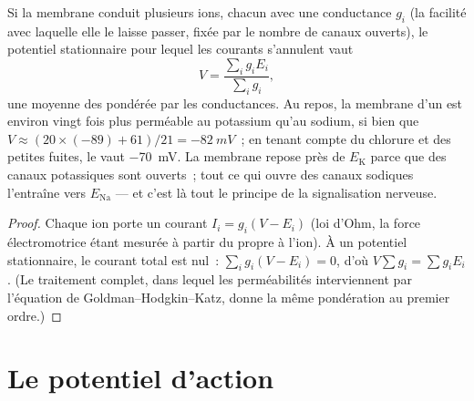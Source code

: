 \begin{theorem}\label{thm:b2:neurons-synapses:chord}
Si la membrane conduit plusieurs ions, chacun avec une conductance $g_i$
(la facilité avec laquelle elle le laisse passer, fixée par le nombre de
canaux ouverts), le potentiel stationnaire pour lequel les courants
s'annulent vaut
\[
V = \frac{\sum_i g_i E_i}{\sum_i g_i},
\]
une moyenne des  pondérée par les conductances.
Au repos, la membrane d'un  est environ vingt fois plus perméable
au potassium qu'au sodium, si bien que $V \approx (20\times(-89) +
61)/21 = \qty{-82}{mV}$~; en tenant compte du chlorure et des petites
fuites, le  vaut \qty{-70}{mV}. La membrane repose
près de $E_{\mathrm K}$ parce que des canaux potassiques sont ouverts~;
tout ce qui ouvre des canaux sodiques l'entraîne vers $E_{\mathrm{Na}}$
--- et c'est là tout le principe de la signalisation nerveuse.
\end{theorem}
\begin{proof}
Chaque ion porte un courant $I_i = g_i(V - E_i)$ (loi d'Ohm, la force
électromotrice étant mesurée à partir du  propre à
l'ion). À un potentiel stationnaire, le courant total est nul~: $\sum_i g_i(V - E_i) =
0$, d'où $V\sum g_i = \sum g_iE_i$. (Le traitement complet, dans lequel
les perméabilités interviennent par l'équation de Goldman--Hodgkin--Katz,
donne la même pondération au premier ordre.)
\end{proof}

\section{Le potentiel d'action}

